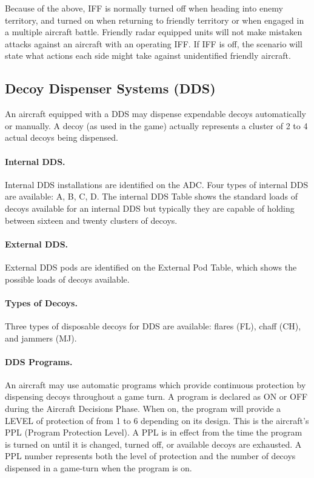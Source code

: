 Because of the above, IFF is normally turned off when heading into enemy territory, and turned on when returning to friendly territory or when engaged in a multiple aircraft battle. Friendly radar equipped units will not make mistaken attacks against an aircraft with an operating IFF. If IFF is off, the scenario will state what actions each side might take against unidentified friendly aircraft.


\subsection{Decoy Dispenser Systems (DDS)}

An aircraft equipped with a DDS may dispense expendable decoys automatically or manually. A decoy (as used in the game) actually represents a cluster of 2 to 4 actual decoys being dispensed.

\paragraph{Internal DDS.} Internal DDS installations are identified on the ADC. Four types of internal DDS are available: A, B, C, D. The internal DDS Table shows the standard loads of decoys available for an internal DDS but typically they are capable of holding between sixteen and twenty clusters of decoys.

\paragraph{External DDS.} External DDS pods are identified on the External Pod Table, which shows the possible loads of decoys available.

\paragraph{Types of Decoys.} Three types of disposable decoys for DDS are available: flares (FL), chaff (CH), and jammers (MJ).

\paragraph{DDS Programs.} An aircraft may use automatic programs which provide continuous protection by dispensing decoys throughout a game turn. A program is declared as ON or OFF during the Aircraft Decisions Phase. When on, the program will provide a LEVEL of protection of from 1 to 6 depending on its design. This is the aircraft's PPL (Program Protection Level). A PPL is in effect from the time the program is turned on until it is changed, turned off, or available decoys are exhausted. A PPL number represents both the level of protection and the number of decoys dispensed in a game-turn when the program is on.

